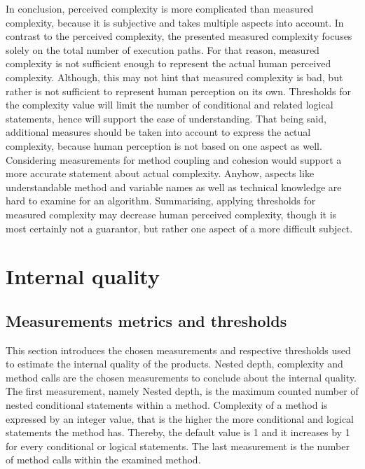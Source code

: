 \documentclass[conference]{IEEEtran}
\begin{document}
In conclusion, perceived complexity is more complicated than measured complexity, because it is subjective and takes multiple aspects into account. In contrast to the perceived complexity, the presented measured complexity focuses solely on the total number of execution paths. For that reason, measured complexity is not sufficient enough to represent the actual human perceived complexity. Although, this may not hint that measured complexity is bad, but rather is not sufficient to represent human perception on its own. Thresholds for the complexity value will limit the number of conditional and related logical statements, hence will support the ease of understanding. That being said, additional measures should be taken into account to express the actual complexity, because human perception is not based on one aspect as well. Considering measurements for method coupling and cohesion would support a more accurate statement about actual complexity. Anyhow, aspects like understandable method and variable names as well as technical knowledge are hard to examine for an algorithm. Summarising, applying thresholds for measured complexity may decrease human perceived complexity, though it is most certainly not a guarantor, but rather one aspect of a more difficult subject.

\section{Internal quality}

\subsection{Measurements metrics and thresholds}
This section introduces the chosen measurements and respective thresholds used to estimate the internal quality of the products. Nested depth, complexity and method calls are the chosen measurements to conclude about the internal quality. The first measurement, namely Nested depth, is the maximum counted number of nested conditional statements within a method. Complexity of a method is expressed by an integer value, that is the higher the more conditional and logical statements the method has. Thereby, the default value is 1 and it increases by 1 for every conditional or logical statements. The last measurement is the number of method calls within the examined method. 
\end{document}

